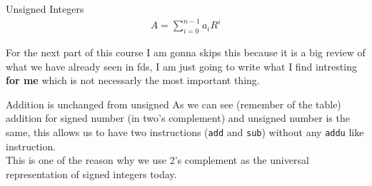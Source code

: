 \begin{parag}{Unsigned Integers}
    \begin{align*} A = \sum_{i = 0}^{n - 1} a_iR^i \end{align*}
\end{parag}
\begin{framedremark}
For the next part of this course I am gonna skips this because it is a big review of what we have already seen in fds, I am just going to write what I find intresting \textbf{for me} which is not necessarly the most important thing.
\end{framedremark}
\begin{parag}{Addition is unchanged from unsigned}
    As we can see (remember of the table) addition for signed number (in two's complement) and unsigned number is the same, this allows us to have  two instructions (\texttt{add} and \texttt{sub}) without any \texttt{addu} like instruction.\\
	This is one of the reason why we use 2's complement as the universal representation of signed integers today.
\end{parag}


